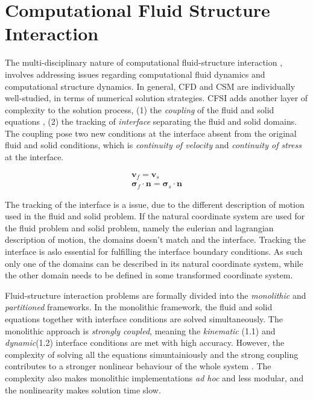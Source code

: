 \chapter{Computational Fluid Structure Interaction}

The multi-disciplinary nature of computational fluid-structure interaction , involves addressing issues regarding computational fluid dynamics and computational structure dynamics. In general, CFD and CSM are individually well-studied, in terms of numerical solution strategies. CFSI adds another layer of complexity to the solution process, (1) the \textit{coupling} of the fluid and solid equations , (2) the tracking of \textit{interface} separating the fluid and solid domains. The coupling pose two new conditions at the interface absent from the original fluid and solid conditions, which is \textit{continuity of velocity} and \textit{continuity of stress} at the interface.

\begin{align}
\mathbf{v}_f = \mathbf{v}_s \\
\mathbf{\sigma}_f \cdot \mathbf{n} = \mathbf{\sigma}_s \cdot \mathbf{n}
\end{align}


The tracking of the interface is a issue, due to the different description of motion used in the fluid and solid problem. If the natural coordinate system are used for the fluid problem and solid problem, namely the eulerian and lagrangian description of motion, the domains doesn't match and the interface. Tracking the interface is aslo essential for fulfilling the interface boundary conditions. As such only one of the domains can be described in its natural coordinate system, while the other domain needs to be defined in some transformed coordinate system.    

Fluid-structure interaction problems are formally divided into the \textit{monolithic} and \textit{partitioned} frameworks.  In the monolithic framework, the fluid and solid equations together with interface conditions are solved simultaneously. The monolithic approach is  \textit{strongly coupled}, meaning the \textit{kinematic} (1.1) and \textit{dynamic}(1.2) interface conditions are met with high accuracy. However, the complexity of solving all the equations simuntainiously and the strong coupling contributes to a stronger nonlinear behaviour of the whole system \cite{Wick}. The complexity also makes monolithic implementations \textit{ad hoc} and less modular, and the nonlinearity makes solution time slow.

